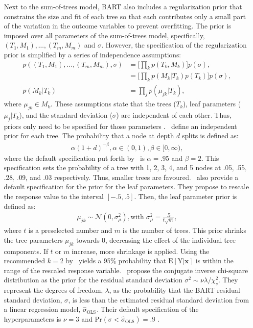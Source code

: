 \documentclass[10pt, a4paper, titlepage]{article}
\begin{document}
Next to the sum-of-trees model, BART also includes a regularization prior that constrains the size and fit of each tree so that each contributes only a small part of the variation in the outcome variables to prevent overfitting. The prior is imposed over all parameters of the sum-of-trees model, specifically, $(T_1, M_1), \dots, (T_m, M_m)$ and $\sigma$. However, the specification of the regularization prior is simplified by a series of independence assumptions: 
\begin{subequations}
\begin{align}
\label{eq:independence_prior}
    p((T_1, M_1), \dots, (T_m, M_m), \sigma) &= \Big[\prod_{k}p(T_k, M_k)\Big]p(\sigma), \\
    &= \Big[\prod_{k}p(M_k|T_k)p(T_k)\Big]p(\sigma), \\
    p(M_k|T_k) &= \prod_{j}p(\mu_{jk}|T_k),
\end{align}
\end{subequations} where $\mu_{jk} \in M_k$. These assumptions state that the trees ($T_{k}$), leaf parameters ($\mu_{j}|T_{k}$), and the standard deviation ($\sigma$) are independent of each other. Thus, priors only need to be specified for those parameters \citep{chipman2010, hill2020, chipman2006, chipman1998}.~\citet{chipman1998} define an independent prior for each tree. The probability that a node at depth $d$ splits is defined as: 
\begin{align}
\label{eq:tree_prior}
    \alpha(1+d)^{-\beta}, \alpha \in (0,1), \beta \in [0, \infty),
\end{align} where the default specification put forth by~\citet{chipman2006,chipman2010} is $\alpha = .95$ and $\beta = 2$. This specification sets the probability of a tree with 1, 2, 3, 4, and 5 nodes at .05, .55, .28, .09, and .03 respectively. Thus, smaller trees are favoured.~\citet{chipman2006,chipman2010} also provide a default specification for the prior for the leaf parameters. They propose to rescale the response value to the interval $[-.5,.5]$. Then, the leaf parameter prior is defined as: 
\begin{align}
\label{eq:leaf_prior}
    \mu_{jk} \sim \mathcal{N}(0, \sigma^2_{\mu}), \text{with } \sigma^2_{\mu} = \frac{.5}{t\sqrt{m}},
\end{align} where $t$ is a preselected number and $m$ is the number of trees. This prior shrinks the tree parameters $\mu_{jk}$ towards 0, decreasing the effect of the individual tree components. If $t$ or $m$ increase, more shrinkage is applied. Using the recommended $k = 2$ by~\citet{chipman2006,chipman2010} yields a 95\% probability that $\text{E}[\text{Y}|\textbf{x}]$ is within the range of the rescaled response variable.~\citet{chipman2006,chipman2010} propose the conjugate inverse chi-square distribution as the prior for the residual standard deviation $\sigma^2 \sim \nu\lambda/\chi^{2}_{\nu}$. They represent the degrees of freedom, $\lambda$, as the probability that the BART residual standard deviation, $\sigma$, is less than the estimated residual standard deviation from a linear regression model, $\hat{\sigma}_\text{OLS}$. Their default specification of the hyperparameters is $\nu = 3$ and $\text{Pr}(\sigma < \hat{\sigma}_\text{OLS}) = .9$ \citep{chipman2010, hill2020, chipman2006, chipman1998}.
\end{document}
